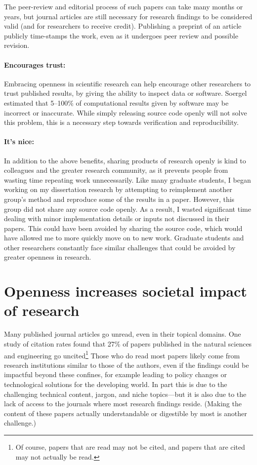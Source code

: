 \documentclass[nobib]{tufte-handout}
\begin{document}
The peer-review and editorial process of such papers can take many months or years,
but journal articles are still necessary for research findings to be considered valid
(and for researchers to receive credit). Publishing a preprint of an article
publicly time-stamps the work, even as it undergoes peer review and possible
revision.

\paragraph{Encourages trust:}
Embracing openness in scientific research can help encourage other researchers
to trust published results, by giving the ability to inspect data or software.
Soergel estimated that 5--100\% of computational results given by software
may be incorrect or inaccurate\autocite{Soergel:2015ef}. While simply releasing
source code openly will not solve this problem, this is a necessary step towards
verification and reproducibility.

\paragraph{It's nice:}
In addition to the above benefits, sharing products of research openly is kind
to colleagues and the greater research community, as it prevents people from
wasting time repeating work unnecessarily.
Like many graduate students, I began working on my dissertation research by
attempting to reimplement another group's method and reproduce some of the
results in a paper. However, this group did not share any source code openly.
As a result, I wasted significant time dealing with minor implementation details
or inputs not discussed in their papers. This could have been avoided by sharing
the source code, which would have allowed me to more quickly move on to new work.
Graduate students and other researchers constantly face similar challenges that
could be avoided by greater openness in research.



\section{Openness increases societal impact of research}
\label{sec:impact}

Many published journal articles go unread, even in their topical domains.
One study of citation rates found that 27\% of papers published in the natural
sciences and engineering go uncited\autocite{Lariviere:2009}\footnote{Of course,
papers that are read may not be cited, and papers that are cited may not actually
be read.}
Those who do read most papers likely come from research institutions similar to
those of the authors, even if the findings could be impactful beyond these
confines, for example leading to policy changes or technological solutions
for the developing world. In part this is due to the challenging technical content,
jargon, and niche topics---but it is also due to the lack of access to the journals
where most research findings reside. (Making the content of these papers actually
understandable or digestible by most is another challenge.)
\end{document}

